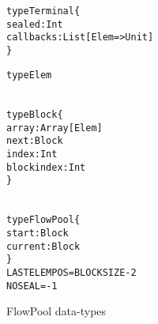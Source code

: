 \documentclass[runningheads,a4paper]{llncs}
\begin{document}
\begin{figure}[t]

\centering

\begin{minipage}[b]{4.5 cm}
\begin{alltt}
{\scriptsize
type Terminal \{
  sealed: Int
  callbacks: List[Elem => Unit]
\}

type Elem
}
\end{alltt}
\end{minipage}
\begin{minipage}[b]{3.5 cm}
\begin{alltt}
{\scriptsize
type Block \{
  array: Array[Elem]
  next: Block
  index: Int
  blockindex: Int
\}
}
\end{alltt}
\end{minipage}
\begin{minipage}[b]{4 cm}
\begin{alltt}
{\scriptsize
type FlowPool \{
  start: Block
  current: Block
\}
LASTELEMPOS = BLOCKSIZE - 2
NOSEAL = -1
}
\end{alltt}
\end{minipage}

\caption{FlowPool data-types}
\label{f-datatypes}
\end{figure}


\setlength\linenumbersep{2pt}
\end{document}
